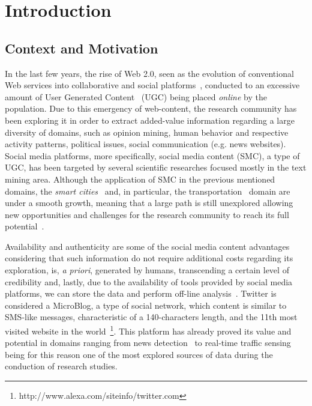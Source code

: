 \chapter{Introduction} \label{chap:intro}

\minitoc \mtcskip \noindent

\section{Context and Motivation}\label{sec:context_motivation}

In the last few years, the rise of Web 2.0, seen as the evolution of conventional Web services into collaborative and social platforms~\cite{chi2008social}, conducted to an excessive amount of User Generated Content~\cite{kaplan2010users} (UGC) being placed \textit{online} by the population. Due to this emergency of web-content, the research community has been exploring it in order to extract added-value information regarding a large diversity of domains, such as opinion mining, human behavior and respective activity patterns, political issues, social communication (e.g. news websites). Social media platforms, more specifically, social media content (SMC), a type of UGC, has been targeted by several scientific researches focused mostly in the text mining area. Although the application of SMC in the previous mentioned domains, the \textit{smart cities}~\cite{batty2012smart} and, in particular, the transportation~\cite{gal2014potential} domain are under a smooth growth, meaning that a large path is still unexplored allowing new opportunities and challenges for the research community to reach its full potential~\cite{kn:Musto2015}.

Availability and authenticity are some of the social media content advantages considering that such information do not require additional costs regarding its exploration, is, \textit{a priori}, generated by humans, transcending a certain level of credibility and, lastly, due to the availability of tools provided by social media platforms, we can store the data and perform off-line analysis~\cite{kuflik2017automating}. Twitter is considered a MicroBlog, a type of social network, which content is similar to SMS-like messages, characteristic of a 140-characters length, and the 11th most visited website in the world~\footnote{http://www.alexa.com/siteinfo/twitter.com}. This platform has already proved its value and potential in domains ranging from news detection~\cite{kn:Sankaranarayanan2009} to real-time traffic sensing~\cite{carvalho2010real} being for this reason one of the most explored sources of data during the conduction of research studies.


